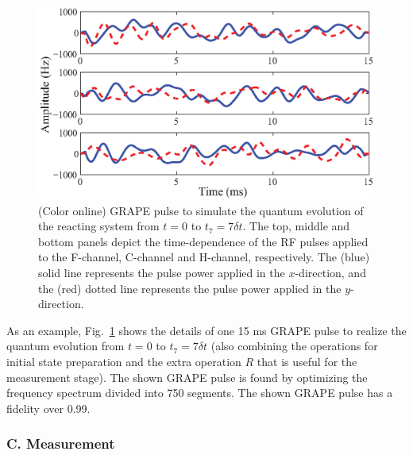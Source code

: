 \documentclass[twocolumn,showpacs,twoside,10pt,prl]{revtex4}
\begin{document}
\begin{figure}[h]
\includegraphics[width= 0.95\columnwidth]{grape.eps}
\caption{\footnotesize{(Color online) GRAPE pulse to simulate the quantum evolution of the reacting system from $t=0$ to $t_7=7\delta t$.
The top, middle and bottom panels depict the time-dependence of the RF pulses applied to the F-channel, C-channel and H-channel, respectively.
The (blue) solid line represents the pulse power applied in the ${x}$-direction, and the (red) dotted line represents the pulse power applied in the ${y}$-direction.}}
\label{grape}
\end{figure}

As an example,  Fig.~\ref{grape} shows the details of one 15 ms GRAPE pulse to realize the quantum evolution from $t=0$ to $t_7=7\delta t$ (also combining the operations for initial state preparation and the extra operation $R$ that is useful for the measurement stage). The shown GRAPE pulse is found by optimizing the frequency spectrum divided into 750 segments. The shown GRAPE pulse has a fidelity over 0.99.

\subsubsection*{\textbf{C. Measurement}}
\end{document}
